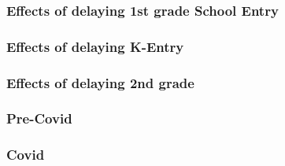 \documentclass{beamer}
\begin{document}
\begin{frame}
    \frametitle{Effects of delaying 1st grade School Entry}
    
\end{frame}

\begin{frame}
    \frametitle{Effects of delaying K-Entry}
    
\end{frame}


\begin{frame}
    \frametitle{Effects of delaying 2nd grade}
    
\end{frame}

\begin{frame}
    \label{update_scott}
    \frametitle{Pre-Covid}
 {
    }
\end{frame}

\begin{frame}
    \label{update_scott}
    \frametitle{Covid}
 {
    }
\end{frame}
\end{document}
